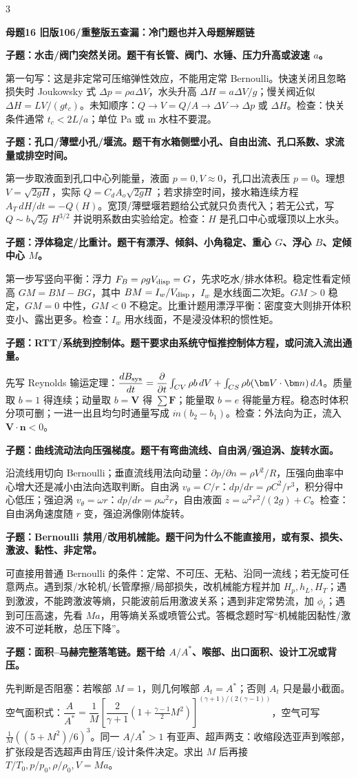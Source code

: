 \documentclass[a4paper]{article}
\newcommand{\mt}[1]{\vspace{0.45pt}\colorbox{M}{\parbox{\dimexpr\linewidth-2\fboxsep}{\color{white}\bfseries #1}}\par}
\newcommand{\qt}[1]{\vspace{0.25pt}\colorbox{Q}{\parbox{\dimexpr\linewidth-2\fboxsep}{\color{white}\bfseries #1}}\par}
\newcommand{\ans}[1]{\colorbox{G}{\parbox{\dimexpr\linewidth-2\fboxsep}{#1}}\par}
\begin{document}
\begin{multicols}{3}
\mt{母题16 旧版106/重整版五查漏：冷门题也并入母题解题链}
\qt{子题：水击/阀门突然关闭。题干有长管、阀门、水锤、压力升高或波速 $a$。}
\ans{第一句写：这是非定常可压缩弹性效应，不能用定常 Bernoulli。快速关闭且忽略损失时 Joukowsky 式 $\Delta p=\rho a\Delta V$，水头升高 $\Delta H=a\Delta V/g$；慢关阀近似 $\Delta H=LV/(gt_c)$。未知顺序：$Q\to V=Q/A\to\Delta V\to\Delta p$ 或 $\Delta H$。检查：快关条件通常 $t_c<2L/a$；单位 Pa 或 m 水柱不要混。}
\qt{子题：孔口/薄壁小孔/堰流。题干有水箱侧壁小孔、自由出流、孔口系数、求流量或排空时间。}
\ans{第一步取液面到孔口中心列能量，液面 $p=0,V\approx0$，孔口出流表压 $p=0$。理想 $V=\sqrt{2gH}$，实际 $Q=C_dA_o\sqrt{2gH}$；若求排空时间，接水箱连续方程 $A_T\,dH/dt=-Q(H)$。宽顶/薄壁堰若题给公式就只负责代入；若无公式，写 $Q\sim b\sqrt{2g}\,H^{3/2}$ 并说明系数由实验给定。检查：$H$ 是孔口中心或堰顶以上水头。}
\qt{子题：浮体稳定/比重计。题干有漂浮、倾斜、小角稳定、重心 $G$、浮心 $B$、定倾中心 $M$。}
\ans{第一步写竖向平衡：浮力 $F_B=\rho gV_{\rm disp}=G$，先求吃水/排水体积。稳定性看定倾高 $GM=BM-BG$，其中 $BM=I_w/V_{\rm disp}$，$I_w$ 是水线面二次矩。$GM>0$ 稳定，$GM=0$ 中性，$GM<0$ 不稳定。比重计题用漂浮平衡：密度变大则排开体积变小、露出更多。检查：$I_w$ 用水线面，不是浸没体积的惯性矩。}
\qt{子题：RTT/系统到控制体。题干要求由系统守恒推控制体方程，或问流入流出通量。}
\ans{先写 Reynolds 输运定理：$\dfrac{dB_{\rm sys}}{dt}=\dfrac{\partial}{\partial t}\int_{CV}\rho b\,dV+\int_{CS}\rho b(\bm V\cdot\bm n)\,dA$。质量取 $b=1$ 得连续；动量取 $b=\bm V$ 得 $\sum\bm F$；能量取 $b=e$ 得能量方程。稳态时体积分项可删；一进一出且均匀时通量写成 $\dot m(b_2-b_1)$。检查：外法向为正，流入 $\bm V\cdot\bm n<0$。}
\qt{子题：曲线流动法向压强梯度。题干有弯曲流线、自由涡/强迫涡、旋转水面。}
\ans{沿流线用切向 Bernoulli；垂直流线用法向动量：$\partial p/\partial n=\rho V^2/R$，压强向曲率中心增大还是减小由法向选取判断。自由涡 $v_\theta=C/r$：$dp/dr=\rho C^2/r^3$，积分得中心低压；强迫涡 $v_\theta=\omega r$：$dp/dr=\rho\omega^2r$，自由液面 $z=\omega^2r^2/(2g)+C$。检查：自由涡角速度随 $r$ 变，强迫涡像刚体旋转。}
\qt{子题：Bernoulli 禁用/改用机械能。题干问为什么不能直接用，或有泵、损失、激波、黏性、非定常。}
\ans{可直接用普通 Bernoulli 的条件：定常、不可压、无粘、沿同一流线；若无旋可任意两点。遇到泵/水轮机/长管摩擦/局部损失，改机械能方程并加 $H_p,h_L,H_T$；遇到激波，不能跨激波等熵，只能波前后用激波关系；遇到非定常势流，加 $\phi_t$；遇到可压高速，先看 $Ma$，用等熵关系或喷管公式。答概念题时写“机械能因黏性/激波不可逆耗散，总压下降”。}
\qt{子题：面积--马赫完整落笔链。题干给 $A/A^*$、喉部、出口面积、设计工况或背压。}
\ans{先判断是否阻塞：若喉部 $M=1$，则几何喉部 $A_t=A^*$；否则 $A_t$ 只是最小截面。空气面积式：$\dfrac{A}{A^*}=\dfrac1M\left[\dfrac{2}{\gamma+1}(1+\frac{\gamma-1}{2}M^2)\right]^{(\gamma+1)/(2(\gamma-1))}$，空气可写 $\frac1M((5+M^2)/6)^3$。同一 $A/A^*>1$ 有亚声、超声两支：收缩段选亚声到喉部，扩张段是否选超声由背压/设计条件决定。求出 $M$ 后再接 $T/T_0,p/p_0,\rho/\rho_0,V=Ma$。}

\end{multicols}
\end{document}
